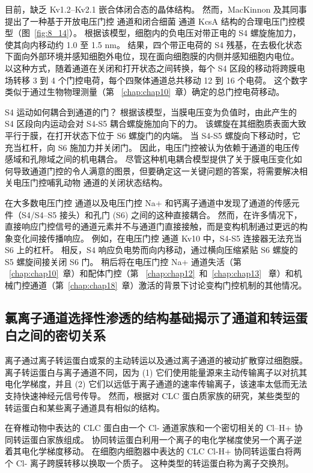 目前，缺乏 Kv1.2–Kv2.1 嵌合体闭合态的晶体结构。 然而，MacKinnon 及其同事提出了一种基于开放电压门控  通道和闭合细菌  通道 KcsA 结构的合理电压门控模型（图~\ref{fig:8_14}）。
根据该模型，细胞内的负电压对带正电的 S4 螺旋施加力，使其向内移动约 1.0 至 1.5 nm。
结果，四个带正电荷的 S4 残基，在去极化状态下面向外部环境并感知细胞外电位，现在面向细胞膜的内侧并感知细胞内电位。
以这种方式，随着通道在关闭和打开状态之间转换，每个 S4 区段的移动将跨膜电场转移 3 到 4 个门控电荷，每个四聚体通道总共移动 12 到 16 个电荷。 
这个数字类似于通过生物物理测量（第 ~\ref{chap:chap10}~章）确定的总门控电荷移动。


S4 运动如何耦合到通道的门？
根据该模型，当膜电压变为负值时，由此产生的 S4 区段向内运动会对 S4-S5 耦合螺旋施加向下的力。
该螺旋在其细胞质表面大致平行于膜，在打开状态下位于 S6 螺旋门的内端。
当 S4-S5 螺旋向下移动时，它充当杠杆，向 S6 施加力并关闭门。
因此，电压门控被认为依赖于通道的电压传感域和孔隙域之间的机电耦合。
尽管这种机电耦合模型提供了关于膜电压变化如何导致通道门控的令人满意的图景，但要确定这一关键问题的答案，将需要解决相关电压门控哺乳动物  通道的关闭状态结构。


在大多数电压门控  通道以及电压门控 Na+ 和钙离子通道中发现了通道的传感元件（S4/S4–S5 接头）和孔门 (S6) 之间的这种直接耦合。
然而，在许多情况下，直接响应门控信号的通道元素并不与通道门直接接触，而是变构机制通过更远的构象变化间接传播响应。
例如，在电压门控  通道 Kv10 中，S4-S5 连接器无法充当 S6 上的杠杆。
相反，S4 响应负电势而向内移动，通过横向压缩紧贴 S6 螺旋的 S5 螺旋间接关闭 S6 门。
稍后将在电压门控 Na+ 通道失活（第 ~\ref{chap:chap10}~章）和配体门控（第 ~\ref{chap:chap12}~和~\ref{chap:chap13}~ 章）和机械门控通道（第~\ref{chap:chap18}~章）激活的背景下讨论变构门控机制的其他情况。



\subsection{氯离子通道选择性渗透的结构基础揭示了通道和转运蛋白之间的密切关系}

离子通过离子转运蛋白或泵的主动转运以及通过离子通道的被动扩散穿过细胞膜。
离子转运蛋白与离子通道不同，因为 (1) 它们使用能量源来主动传输离子以对抗其电化学梯度，并且 (2) 它们以远低于离子通道的速率传输离子，该速率太低而无法支持快速神经元信号传导。
然而，根据对 CLC 蛋白质家族的研究，某些类型的转运蛋白和某些离子通道具有相似的结构。


在脊椎动物中表达的 CLC 蛋白由一个 Cl- 通道家族和一个密切相关的 Cl--H+ 协同转运蛋白家族组成。
协同转运蛋白利用一个离子的电化学梯度使另一个离子逆着其电化学梯度移动。
在细胞内细胞器中表达的 CLC Cl-H+ 协同转运蛋白将两个 Cl- 离子跨膜转移以换取一个质子。
这种类型的转运蛋白称为离子交换剂。


